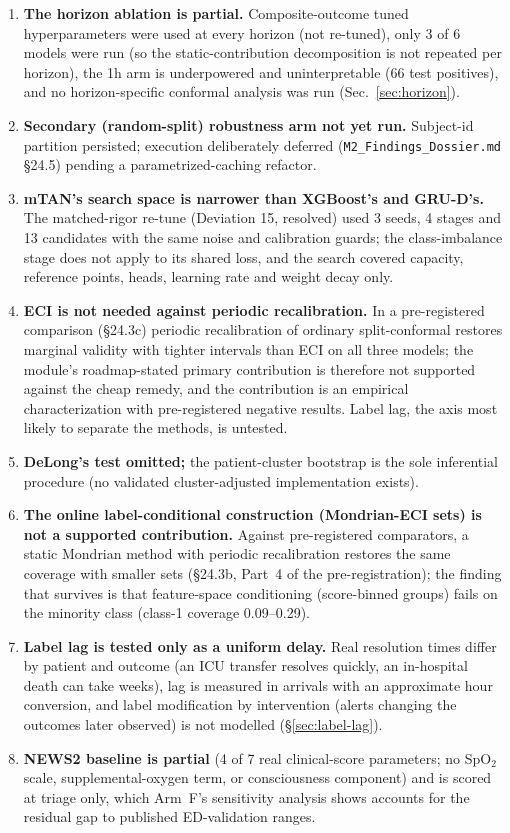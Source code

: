 \documentclass[11pt]{article}
\begin{document}
\begin{enumerate}[leftmargin=*]
\item \textbf{The horizon ablation is partial.} Composite-outcome tuned hyperparameters were used at every horizon (not re-tuned), only 3 of 6 models were run (so the static-contribution decomposition is not repeated per horizon), the 1h arm is underpowered and uninterpretable (66 test positives), and no horizon-specific conformal analysis was run (Sec.~\ref{sec:horizon}).
\item \textbf{Secondary (random-split) robustness arm not yet run.} Subject-id partition persisted; execution deliberately deferred (\texttt{M2\_Findings\_Dossier.md} \S24.5) pending a parametrized-caching refactor.
\item \textbf{mTAN's search space is narrower than XGBoost's and GRU-D's.} The matched-rigor re-tune (Deviation 15, resolved) used 3 seeds, 4 stages and 13 candidates with the same noise and calibration guards; the class-imbalance stage does not apply to its shared loss, and the search covered capacity, reference points, heads, learning rate and weight decay only.
\item \textbf{ECI is not needed against periodic recalibration.} In a pre-registered comparison (\S24.3c) periodic recalibration of ordinary split-conformal restores marginal validity with tighter intervals than ECI on all three models; the module's roadmap-stated primary contribution is therefore not supported against the cheap remedy, and the contribution is an empirical characterization with pre-registered negative results. Label lag, the axis most likely to separate the methods, is untested.
\item \textbf{DeLong's test omitted;} the patient-cluster bootstrap is the sole inferential procedure (no validated cluster-adjusted implementation exists).
\item \textbf{The online label-conditional construction (Mondrian-ECI sets) is not a supported contribution.} Against pre-registered comparators, a static Mondrian method with periodic recalibration restores the same coverage with smaller sets (\S24.3b, Part~4 of the pre-registration); the finding that survives is that feature-space conditioning (score-binned groups) fails on the minority class (class-1 coverage 0.09--0.29).
\item \textbf{Label lag is tested only as a uniform delay.} Real resolution times differ by patient and outcome (an ICU transfer resolves quickly, an in-hospital death can take weeks), lag is measured in arrivals with an approximate hour conversion, and label modification by intervention (alerts changing the outcomes later observed) is not modelled (\S\ref{sec:label-lag}).
\item \textbf{NEWS2 baseline is partial} (4 of 7 real clinical-score parameters; no SpO$_2$ scale, supplemental-oxygen term, or consciousness component) and is scored at triage only, which Arm~F's sensitivity analysis shows accounts for the residual gap to published ED-validation ranges.
\end{enumerate}
\end{document}
